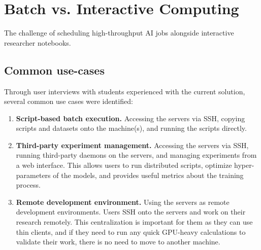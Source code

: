 \section{Batch vs. Interactive Computing}
\label{sec:batch-vs-interactive}

The challenge of scheduling high-throughput AI jobs alongside interactive researcher notebooks.


\subsection{Common use-cases}

Through user interviews with students experienced with the current solution, several common use cases were identified:


\begin{enumerate}
    \item \textbf{Script-based batch execution.} Accessing the servers via SSH, copying scripts and datasets onto the machine(s), and running the scripts directly.
    \item \textbf{Third-party experiment management.} Accessing the servers via SSH, running third-party daemons on the servers, and managing experiments from a web interface. This allows users to run distributed scripts, optimize hyper-parameters of the models, and provides useful metrics about the training process.

    \item \textbf{Remote development environment.} Using the servers as remote development environments. Users SSH onto the servers and work on their research remotely. This centralization is important for them as they can use thin clients, and if they need to run any quick GPU-heavy calculations to validate their work, there is no need to move to another machine.
\end{enumerate}

